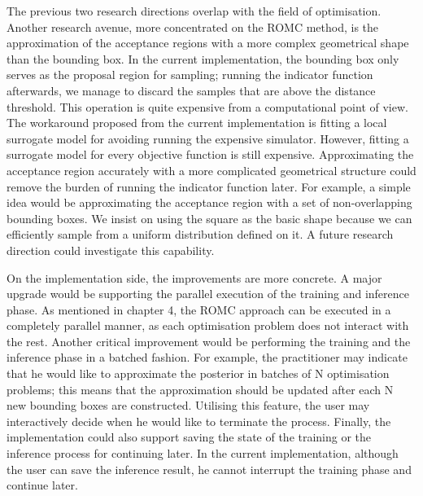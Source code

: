 The previous two research directions overlap with the field of
optimisation. Another research avenue, more concentrated on the ROMC
method, is the approximation of the acceptance regions with a more
complex geometrical shape than the bounding box. In the current
implementation, the bounding box only serves as the proposal region
for sampling; running the indicator function afterwards, we manage to
discard the samples that are above the distance threshold. This
operation is quite expensive from a computational point of view. The
workaround proposed from the current implementation is fitting a local
surrogate model for avoiding running the expensive simulator. However,
fitting a surrogate model for every objective function is still
expensive. Approximating the acceptance region accurately with a more
complicated geometrical structure could remove the burden of running
the indicator function later. For example, a simple idea would be
approximating the acceptance region with a set of non-overlapping
bounding boxes. We insist on using the square as the basic shape
because we can efficiently sample from a uniform distribution defined
on it. A future research direction could investigate this capability.


On the implementation side, the improvements are more concrete. A
major upgrade would be supporting the parallel execution of the
training and inference phase. As mentioned in chapter 4, the ROMC
approach can be executed in a completely parallel manner, as each
optimisation problem does not interact with the rest. Another critical
improvement would be performing the training and the inference phase
in a batched fashion. For example, the practitioner may indicate that
he would like to approximate the posterior in batches of N
optimisation problems; this means that the approximation should be
updated after each N new bounding boxes are constructed. Utilising
this feature, the user may interactively decide when he would like to
terminate the process. Finally, the implementation could also support
saving the state of the training or the inference process for
continuing later. In the current implementation, although the user can
save the inference result, he cannot interrupt the training phase and
continue later.